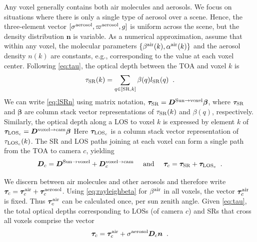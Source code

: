 \documentclass[10pt,letterpaper]{article}
\newcommand{\vect}[1]{\bm{#1}}
\newcommand{\OpDistance}{\bm{D}}
\newcommand{\DistUnknown}{\vect{n}}
\begin{document}
Any voxel generally contains both air molecules and aerosols.  We
focus on situations where there is only a single type of aerosol over
a scene. Hence, the three-element vector $[{\sigma}^{\rm
  aerosol},\varpi^{\rm aerosol},g]$ is uniform across the scene, but
the density distribution ${\DistUnknown}$ is variable. As a numerical
approximation, assume that within any voxel, the molecular parameters
$\{ \beta^{\rm air}(k),\alpha^{\rm air}(k)\}$ and the aerosol density
$n(k)$ are constants, e.g., corresponding to the value at each voxel
center.  Following \cref{eq:tau}, the optical depth between the TOA
and voxel $k$ is
\begin{equation}
  \tau_{\rm SR}(k)= \sum_{q \in[{\rm SR},k]} \beta(q) l_{\rm SR}(q) \;\;.
  \label{eq:lSRn}
\end{equation}
We can write \cref{eq:lSRn} using matrix notation, $\vect{\tau}_{\rm
  SR}=\OpDistance^{\mathrm{Sun \rightarrow voxel}} \vect{\beta}$,
where $\vect{\tau}_{\rm SR}$ and $\vect{\beta}$ are column stack
vector representations of $\tau_{\rm SR}(k)$ and $\beta(q)$,
respectively. Similarly, the optical depth along a LOS to voxel $k$ is
expressed by element $k$ of $\vect{\tau}_{{\rm LOS}_c} =
\OpDistance^{\mathrm{voxel \rightarrow cam}} \vect{\beta}$ Here
$\vect{\tau}_{{\rm LOS}_c}$ is a column stack vector representation of
$\tau_{{\rm LOS}_c}(k)$.  The SR and LOS paths joining at each voxel
can form a single path from the TOA to camera $c$, yielding
\begin{equation}
  {\bm D}_c=
  {\bm D}^{\mathrm{Sun \rightarrow voxel}}+
  {\bm D}^{\mathrm{voxel \rightarrow cam}}_c
  \quad\text{ and }\quad
  \vect{\tau}_c=
  \vect{\tau}_{\rm SR}+
  \vect{\tau}_{{\rm LOS}_c}
  \;\;.
  \label{eq:D_tau_total}
\end{equation}

We discern between air molecules and other aerosols and therefore
write $ \vect{\tau}_c= \vect{\tau}_c^{\rm air} + \vect{\tau}_c^{\rm
  aerosol}$.  Using \cref{eq:rayleighbeta} for $\beta^{\rm air}$ in
all voxels, the vector $\vect{\tau}_c^{\rm air}$ is fixed. Thus
$\vect{\tau}_c^{\rm air}$ can be calculated once, per sun zenith
angle. Given \cref{eq:tau}, the total optical depths corresponding to
LOSs (of camera $c$) and SRs that cross all voxels comprise the vector
\begin{equation}
  \vect{\tau}_c= \vect{\tau}_c^{\rm air}
  + \sigma^{\rm aerosol} {\bm D}_c {\bm n}
  \;\;.
  \label{eq:tautotal}
\end{equation}
\end{document}
